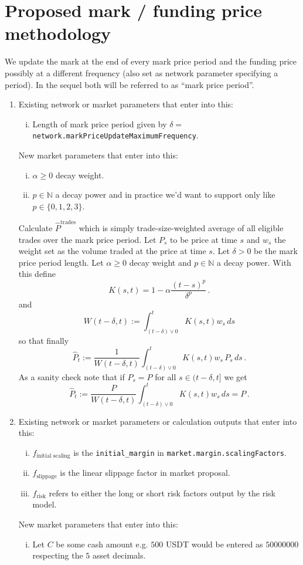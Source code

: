 \documentclass[10pt]{article}
\begin{document}
\section{Proposed mark / funding price methodology}
We update the mark at the end of every mark price period and the funding price possibly at a different frequency (also set as network parameter specifying a period). 
In the sequel both will be referred to as ``mark price period''.
\begin{enumerate}
\item 
Existing network or market parameters that enter into this:
\begin{enumerate}[i)]
\item Length of mark price period given by $\delta = $\texttt{network.markPriceUpdateMaximumFrequency}.
\end{enumerate}
New market parameters that enter into this:
\begin{enumerate}[i)]
\item $\alpha \geq 0$ decay weight. 
\item $p \in \mathbb N$ a decay power and in practice we'd want to support only like $p \in \{0,1,2,3\}$.
\end{enumerate}

Calculate $\hat P^{\text{trades}}$ which is simply trade-size-weighted average of all eligible trades over the mark price period. 
Let $P_s$ to be price at time $s$ and $w_s$ the weight set as the volume traded at the price at time $s$.
Let $\delta > 0$ be the mark price period length. 
Let $\alpha \geq 0$ decay weight and $p\in \mathbb N$ a decay power. 
With this define
\[
K(s,t) = 1 - \alpha\frac{(t-s)^p}{\delta^p}\,.
\]
and 
\[
W(t-\delta, t) := \int_{(t-\delta) \vee 0}^t K(s,t) w_s \,ds
\]
so that finally
\[
\hat P_t := \frac{1}{W(t-\delta, t)} \int_{(t-\delta) \vee 0}^t K(s,t) w_s \,P_s \,ds\,.
\]
As a sanity check note that if $P_s = P$ for all $s\in (t-\delta, t]$ we get 
\[
\hat P_t := \frac{P}{W(t-\delta, t)} \int_{(t-\delta) \vee 0}^t K(s,t) w_s \,ds = P\,.
\]


\item 
Existing network or market parameters or calculation outputs that enter into this:
\begin{enumerate}[i)]
\item $f_\text{initial scaling}$ is the \texttt{initial\_margin} in \texttt{market.margin.scalingFactors}.
\item $f_\text{slippage}$ is the linear slippage factor in market proposal.
\item $f_\text{risk}$ refers to either the long or short risk factors output by the risk model. 
\end{enumerate}
New market parameters that enter into this:
\begin{enumerate}[i)]
\item Let $C$ be some cash amount e.g. $500$ USDT would be entered as $500 00000$ respecting the $5$ asset decimals.
\end{enumerate}



\end{enumerate}
\end{document}
